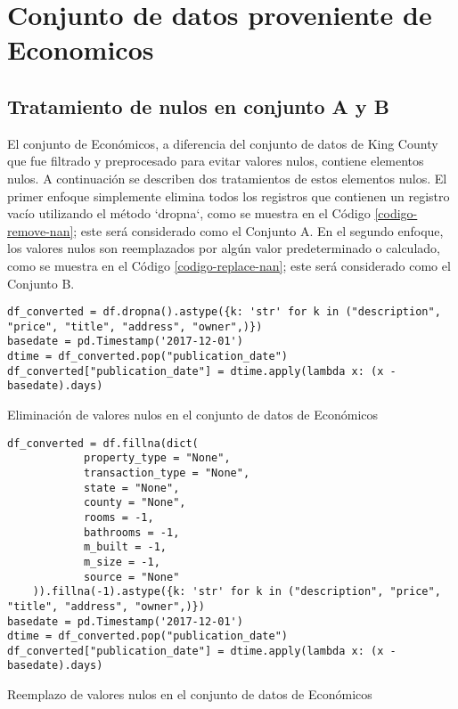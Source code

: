 \section{Conjunto de datos proveniente de Economicos}
\subsection{Tratamiento de nulos en conjunto A y B}
El conjunto de Económicos, a diferencia del conjunto de datos de King County que fue filtrado y preprocesado para evitar valores nulos, contiene elementos nulos. A continuación se describen dos tratamientos de estos elementos nulos. El primer enfoque simplemente elimina todos los registros que contienen un registro vacío utilizando el método `dropna`, como se muestra en el Código \ref{codigo-remove-nan}; este será considerado como el Conjunto A. En el segundo enfoque, los valores nulos son reemplazados por algún valor predeterminado o calculado, como se muestra en el Código \ref{codigo-replace-nan}; este será considerado como el Conjunto B.

\begin{listing}[H]
    \begin{verbatim}
df_converted = df.dropna().astype({k: 'str' for k in ("description", "price", "title", "address", "owner",)})
basedate = pd.Timestamp('2017-12-01')
dtime = df_converted.pop("publication_date")
df_converted["publication_date"] = dtime.apply(lambda x: (x - basedate).days)
    \end{verbatim}
\caption{Eliminación de valores nulos en el conjunto de datos de Económicos}
\label{codigo-remove-nan}
\end{listing}

\begin{listing}[H]
    \begin{verbatim}
df_converted = df.fillna(dict(
            property_type = "None",
            transaction_type = "None",
            state = "None",
            county = "None",
            rooms = -1,
            bathrooms = -1,
            m_built = -1,
            m_size = -1,
            source = "None"
    )).fillna(-1).astype({k: 'str' for k in ("description", "price", "title", "address", "owner",)})
basedate = pd.Timestamp('2017-12-01')
dtime = df_converted.pop("publication_date")
df_converted["publication_date"] = dtime.apply(lambda x: (x - basedate).days)
    \end{verbatim}
\caption{Reemplazo de valores nulos en el conjunto de datos de Económicos}
\label{codigo-replace-nan}
\end{listing}

